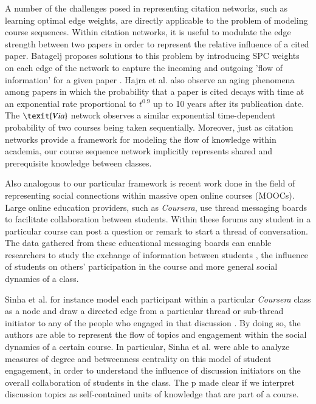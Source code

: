 \documentclass{sigchi}
\begin{document}
A number of the challenges posed in representing citation networks, such as learning optimal edge weights, are directly applicable to the problem of modeling course sequences. Within citation networks, it is useful to modulate the edge strength between two papers in order to represent the relative influence of a cited paper. Batagelj proposes solutions to this problem by introducing SPC weights on each edge of the network to capture the incoming and outgoing 'flow of information' for a given paper \cite{Batagelj2003}. Hajra et al. also observe an aging phenomena among papers in which the probability that a paper is cited decays with time at an exponential rate proportional to $t^{0.9}$ up to 10 years after its publication date. The $\texit{Via}$ network observes a similar exponential time-dependent probability of two courses being taken sequentially. Moreover, just as citation networks provide a framework for modeling the flow of knowledge within academia, our course sequence network implicitly represents shared and prerequisite knowledge between classes. 

Also analogous to our particular framework is recent work done in the field of representing social connections within massive open online courses (MOOCs). Large online education providers, such as \textit{Coursera}, use thread messaging boards to facilitate collaboration between students. Within these forums any student in a particular course can post a question or remark to start a thread of conversation. The data gathered from these educational messaging boards can enable researchers to study the exchange of information between students \cite{Brinton2016}, the influence of students on others' participation in the course \cite{Sinha2014a} and more general social dynamics of a class.

Sinha et al. for instance model each participant within a particular \textit{Coursera} class as a node and draw a directed edge from a particular thread or sub-thread initiator to any of the people who engaged in that discussion \cite{Sinha2014}. By doing so, the authors are able to represent the flow of topics and engagement within the social dynamics of a certain course. In particular, Sinha et al. were able to analyze measures of degree and betweenness centrality on this model of student engagement, in order to understand the influence of discussion initiators on the overall collaboration of students in the class. The p made clear if we interpret discussion topics as self-contained units of knowledge that are part of a course. 
\end{document}
